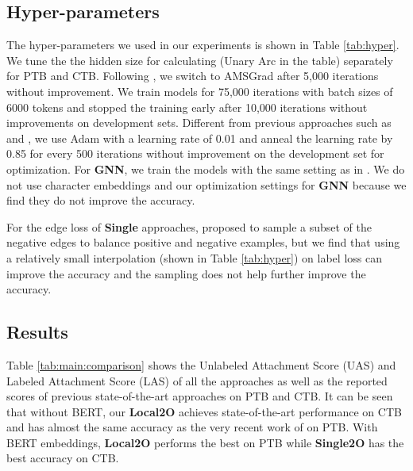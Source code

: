 \documentclass[11pt,a4paper]{article}
\begin{document}
\subsection{Hyper-parameters}


The hyper-parameters we used in our experiments is shown in Table \ref{tab:hyper}. We tune the the hidden size for calculating  
(Unary Arc in the table) separately for PTB and CTB. Following \citet{qi-etal-2018-universal}, we switch to AMSGrad \cite{j.2018on} after 5,000 iterations without improvement. We train models for 75,000 iterations with batch sizes of 6000 tokens and stopped the training early after 10,000 iterations without improvements on development sets. Different from previous approaches such as \citet{dozat2016deep} and \citet{ji-etal-2019-graph}, we use Adam \cite{kingma2014adam} with a learning rate of 0.01 and anneal the learning rate by 0.85 for every 500 iterations without improvement on the development set for optimization. For \textbf{GNN}, we train the models with the same setting as in \citet{ji-etal-2019-graph}. We do not use character embeddings and our optimization settings for \textbf{GNN} because we find they do not improve the accuracy. 

For the edge loss of \textbf{Single} approaches, \citet{zhang-etal-2019-empirical} proposed to sample a subset of the negative edges to balance positive and negative examples, but we find that using a relatively small interpolation  (shown in Table \ref{tab:hyper}) on label loss can improve the accuracy and the sampling does not help further improve the accuracy.

\subsection{Results}
Table \ref{tab:main:comparison} shows the Unlabeled Attachment Score (UAS) and Labeled Attachment Score (LAS) of all the approaches as well as the reported scores of previous state-of-the-art approaches on PTB and CTB. It can be seen that without BERT, our \textbf{Local2O} achieves state-of-the-art performance on CTB and has almost the same accuracy as the very recent work of \citet{zhang2020efficient} on PTB. With BERT embeddings, \textbf{Local2O} performs the best on PTB while \textbf{Single2O} has the best accuracy on CTB. 
\end{document}
